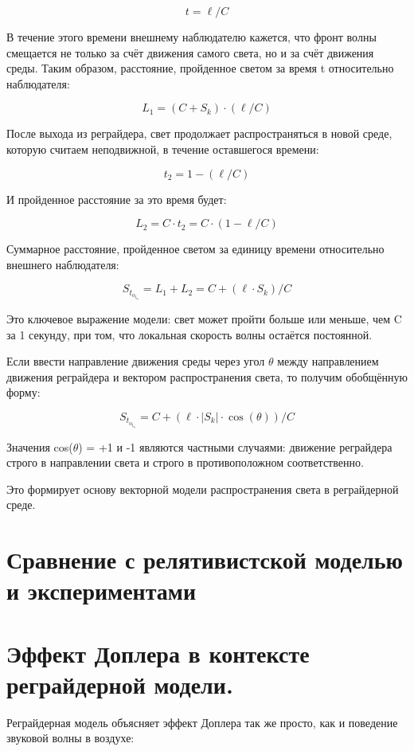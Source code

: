 \documentclass[12pt]{article}
\begin{document}
\[
t = \ell / C
\]

В течение этого времени внешнему наблюдателю кажется, что фронт волны смещается не только за счёт движения самого света, но и за счёт движения среды. Таким образом, расстояние, пройденное светом за время t относительно наблюдателя:

\[
L_1 = (C + S_k) \cdot (\ell / C)
\]

После выхода из реграйдера, свет продолжает распространяться в новой среде, которую считаем неподвижной, в течение оставшегося времени:

\[
t_2 = 1 - (\ell / C)
\]

И пройденное расстояние за это время будет:

\[
L_2 = C \cdot t_2 = C \cdot (1 - \ell / C)
\]

Суммарное расстояние, пройденное светом за единицу времени относительно внешнего наблюдателя:

\[
S_t_o_t_a_l = L_1 + L_2 = C + (\ell \cdot S_k) / C
\]

Это ключевое выражение модели: свет может пройти больше или меньше, чем C за 1 секунду, при том, что локальная скорость волны остаётся постоянной.
\par
Если ввести направление движения среды через угол $\theta$ между направлением движения реграйдера и вектором распространения света, то получим обобщённую форму:

\[
S_t_o_t_a_l = C + (\ell \cdot \left|S_k\right| \cdot \cos(\theta)) / C
\]

Значения cos($\theta$) = +1 и -1 являются частными случаями: движение реграйдера строго в направлении света и строго в противоположном соответственно.
\par
Это формирует основу векторной модели распространения света в реграйдерной среде.

\section*{Сравнение с релятивистской моделью и экспериментами}
\section*{Эффект Доплера в контексте реграйдерной модели.}


Реграйдерная модель объясняет эффект Доплера так же просто, как и поведение звуковой волны в воздухе:
\end{document}
